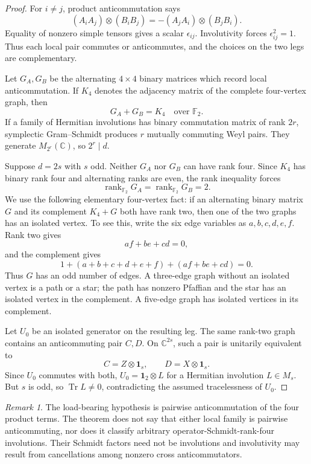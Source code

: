 \documentclass[11pt]{article}
\theoremstyle{definition}
\theoremstyle{remark}
\newtheorem{remark}[theorem]{Remark}
\newcommand{\Id}{\mathbf 1}
\newcommand{\Tr}{\operatorname{Tr}}
\newcommand{\rank}{\operatorname{rank}}
\newcommand{\bbC}{\mathbb C}
\begin{document}
\begin{proof}
For \(i\ne j\), product anticommutation says
\[
 (A_iA_j)\otimes(B_iB_j)
 =-(A_jA_i)\otimes(B_jB_i).
\]
Equality of nonzero simple tensors gives a scalar \(\epsilon_{ij}\).
Involutivity forces \(\epsilon_{ij}^2=1\). Thus each local pair commutes
or anticommutes, and the choices on the two legs are complementary.

Let \(G_A,G_B\) be the alternating \(4\times4\) binary matrices which
record local anticommutation. If \(K_4\) denotes the adjacency matrix of
the complete four-vertex graph, then
\[
  G_A+G_B=K_4
  \quad\text{over }\mathbb F_2.
\]
If a family of Hermitian involutions has binary commutation matrix of
rank \(2r\), symplectic Gram--Schmidt produces \(r\) mutually commuting
Weyl pairs. They generate \(M_{2^r}(\bbC)\), so \(2^r\mid d\).

Suppose \(d=2s\) with \(s\) odd. Neither \(G_A\) nor \(G_B\) can have
rank four. Since \(K_4\) has binary rank four and alternating ranks are
even, the rank inequality forces
\[
 \rank_{\mathbb F_2}G_A
 =\rank_{\mathbb F_2}G_B=2.
\]
We use the following elementary four-vertex fact: if an alternating
binary matrix \(G\) and its complement \(K_4+G\) both have rank two,
then one of the two graphs has an isolated vertex. To see this, write the
six edge variables as \(a,b,c,d,e,f\). Rank two gives
\[
 af+be+cd=0,
\]
and the complement gives
\[
 1+(a+b+c+d+e+f)+(af+be+cd)=0.
\]
Thus \(G\) has an odd number of edges. A three-edge graph without an
isolated vertex is a path or a star; the path has nonzero Pfaffian and the
star has an isolated vertex in the complement. A five-edge graph has
isolated vertices in its complement.

Let \(U_0\) be an isolated generator on the resulting leg. The same
rank-two graph contains an anticommuting pair \(C,D\). On
\(\bbC^{2s}\), such a pair is unitarily equivalent to
\[
 C=Z\otimes\Id_s,\qquad D=X\otimes\Id_s.
\]
Since \(U_0\) commutes with both, \(U_0=\Id_2\otimes L\) for a Hermitian
involution \(L\in M_s\). But \(s\) is odd, so
\(\Tr L\ne0\), contradicting the assumed tracelessness of \(U_0\).
\end{proof}

\begin{remark}
The load-bearing hypothesis is pairwise anticommutation of the four
product terms. The theorem does not say that either local family is
pairwise anticommuting, nor does it classify arbitrary
operator-Schmidt-rank-four involutions. Their Schmidt factors need not be
involutions and involutivity may result from cancellations among nonzero
cross anticommutators.
\end{remark}
\end{document}

